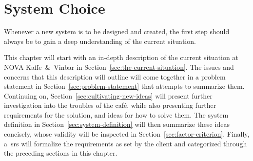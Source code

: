 \chapter{System Choice}\label{ch:system-choice}

Whenever a new system is to be designed and created, the first step should always be to gain a deep understanding of the
current situation.

This chapter will start with an in-depth description of the current situation at NOVA Kaffe~\&~Vinbar in
Section~\ref{sec:the-current-situation}.
The issues and concerns that this description will outline will come together in a problem statement in
Section~\ref{sec:problem-statement} that attempts to summarize them.
Continuing on, Section~\ref{sec:cultivating-new-ideas} will present further investigation into the troubles of the café,
while also presenting further requirements for the solution, and ideas for how to solve them.
The system definition in Section~\ref{sec:system-definition} will then summarize these ideas concisely, whose validity
will be inspected in Section~\ref{sec:factor-criterion}.
Finally, a~\acrfull{srs} will formalize the requirements as set by the client and categorized through the preceding
sections in this chapter.








